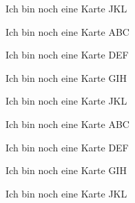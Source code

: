 \documentclass[a6paper,7pt,print,grid=rear,flip]{kartei}
\begin{document}
	\begin{karte}{Ich bin noch eine Karte}
		JKL
	\end{karte}
	\begin{karte}{Ich bin noch eine Karte}
		ABC
	\end{karte}
	\begin{karte}{Ich bin noch eine Karte}
		DEF
	\end{karte}
	\begin{karte}{Ich bin noch eine Karte}
		GIH
	\end{karte}
	\begin{karte}{Ich bin noch eine Karte}
		JKL
	\end{karte}
	\begin{karte}{Ich bin noch eine Karte}
		ABC
	\end{karte}
	\begin{karte}{Ich bin noch eine Karte}
		DEF
	\end{karte}
	\begin{karte}{Ich bin noch eine Karte}
		GIH
	\end{karte}
	\begin{karte}{Ich bin noch eine Karte}
		JKL
	\end{karte}
\end{document}
